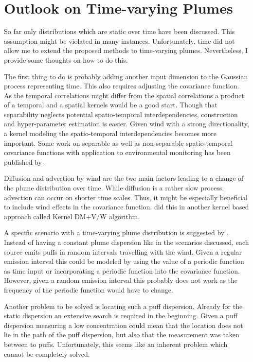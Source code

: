 \chapter{Outlook on Time-varying Plumes}\label{sec:timevarying}
So far only distributions which are static over time have been discussed. This 
assumption might be violated in many instances. Unfortunately, time did not 
allow me to extend the proposed methods to time-varying plumes. Nevertheless, 
I provide some thoughts on how to do this.

The first thing to do is probably adding another input dimension to the Gaussian 
process representing time. This also requires adjusting the covariance function.  
As the temporal correlations might differ from the spatial correlations 
a product of a temporal and a spatial kernels would be a good start. Though that 
separability neglects potential spatio-temporal interdependencies, construction 
and hyper-parameter estimation is easier. Given wind with a strong 
directionality, a kernel modeling the spatio-temporal interdependencies becomes 
more important. Some work on separable as well as non-separable spatio-temporal 
covariance functions with application to environmental monitoring has been 
published by \textcite{Singh:2010wt}.

Diffusion and advection by wind are the two main factors leading to a change of 
the plume distribution over time. While diffusion is a rather slow process, 
advection can occur on shorter time scales. Thus, it might be especially 
beneficial to include wind effects in the covariance function.  
\Textcite{Reggente:2009ti,Lilienthal:2009ij} did this in another kernel based 
approach called Kernel DM+V/W algorithm.

A specific scenario with a time-varying plume distribution is suggested by 
\textcite{denardi2013rn}. Instead of having a constant plume dispersion like in 
the scenarios discussed, each source emits puffs in random intervals travelling 
with the wind.  Given a regular emission interval this could be modeled by using 
the value of a periodic function as time input or incorporating a periodic 
function into the covariance function.  However, given a random emission 
interval this probably does not work as the frequency of the periodic function 
would have to change.

Another problem to be solved is locating such a puff dispersion. Already for the 
static dispersion an extensive search is required in the beginning. Given a puff 
dispersion measuring a low concentration could mean that the location does not 
lie in the path of the puff dispersion, but also that the measurement was taken 
between to puffs. Unfortunately, this seems like an inherent problem which 
cannot be completely solved.

